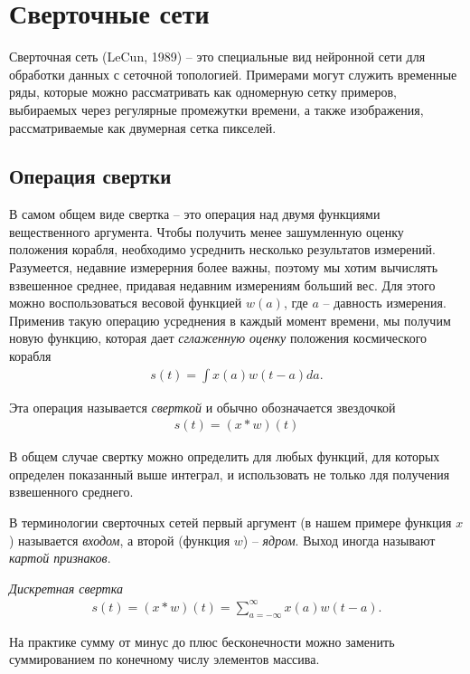\documentclass[%
	11pt,
	a4paper,
	utf8,
]{article}
\begin{document}
\section{Сверточные сети}

Сверточная сеть (LeCun, 1989) -- это специальные вид нейронной сети для обработки данных с сеточной топологией. Примерами могут служить временные ряды, которые можно рассматривать как одномерную сетку примеров, выбираемых через регулярные промежутки времени, а также изображения, рассматриваемые как двумерная сетка пикселей.

\subsection{Операция свертки}

В самом общем виде свертка -- это операция над двумя функциями вещественного аргумента. Чтобы получить менее зашумленную оценку положения корабля, необходимо усреднить несколько результатов измерений. Разумеется, недавние измерерния более важны, поэтому мы хотим вычислять взвешенное среднее, придавая недавним измерениям больший вес. Для этого можно воспользоваться весовой функцией $ w(a) $, где $ a $ -- давность измерения. Применив такую операцию усреднения в каждый момент времени, мы получим новую функцию, которая дает \emph{сглаженную оценку} положения космического корабля
\begin{align*}
	s(t) = \int x(a) w(t - a) da.
\end{align*}

Эта операция называется \emph{сверткой} и обычно обозначается звездочкой
\begin{align*}
	s(t) = (x * w)(t)
\end{align*}

В общем случае свертку можно определить для любых функций, для которых определен показанный выше интеграл, и использовать не только лдя получения взвешенного среднего.

В терминологии сверточных сетей первый аргумент (в нашем примере функция $ x $) называется \emph{входом}, а второй (функция $ w $) -- \emph{ядром}. Выход иногда называют \emph{картой признаков}.

\emph{Дискретная свертка}
\begin{align*}
	s(t) = (x * w)(t) = \sum_{a=-\infty}^{\infty} x(a) w(t - a).
\end{align*}

На практике сумму от минус до плюс бесконечности можно заменить суммированием по конечному числу элементов массива.
\end{document}
